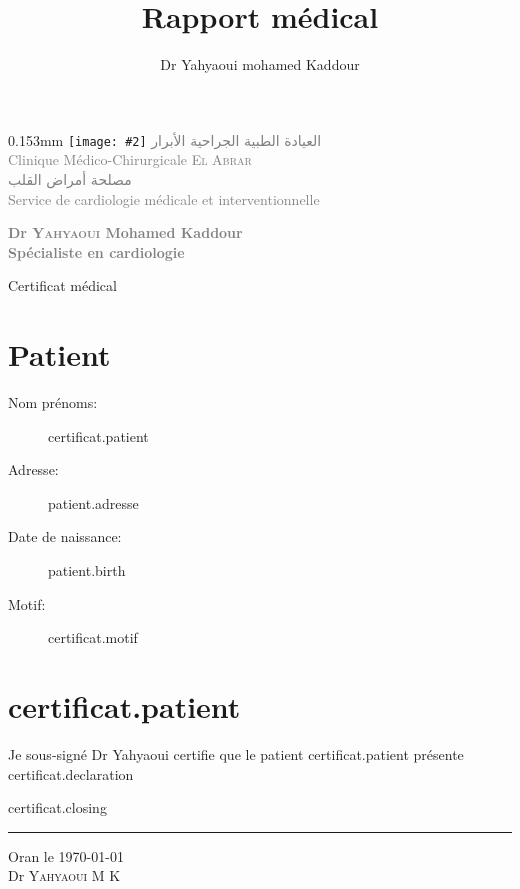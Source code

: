 \documentclass[12pt,a4paper]{article}
\author{Dr Yahyaoui mohamed Kaddour}
\title{Rapport médical }
\newcommand{\imagetext}[3][0.15]{%
    \begin{imagetextbox}[]{#1\textwidth}{3mm}%
      \texttt{[image: \#2]}%
      \tcblower%
	    #3%
    \end{imagetextbox}}
\begin{document}

  \imagetext{media/logo.png}{\textcolor{Gray}{\large{\textarabic{العيادة الطبية الجراحية الأبرار}}\\
      Clinique Médico-Chirurgicale \textsc{El Abrar}\\
      \textarabic{ مصلحة أمراض القلب}\\
      \small{Service de cardiologie médicale et interventionnelle}
    }}
  \begin{center}
    \textcolor{gray}{\textbf{ Dr \textsc{Yahyaoui} Mohamed Kaddour\\
        Spécialiste en cardiologie}\\
    }
  \end{center}

  \begin{center} \huge{Certificat médical}

  \end{center}


  \section{Patient}
  \begin{description}
	\item[Nom prénoms:] {{ certificat.patient }}
	\item[Adresse:] {{ patient.adresse }}
	\item[Date de naissance:] {{ patient.birth }}

  \item[Motif:] {{ certificat.motif }}
    \end{description}
    \section*{ {{ certificat.patient}} }

    Je sous-signé Dr Yahyaoui certifie que le patient {{ certificat.patient }}
    présente {{ certificat.declaration }}


    \raggedright{ {{certificat.closing}} }
                  
                  \begin{center}
                    \rule{8cm}{0.4pt}
                  \end{center}
                  \vspace{2cm}
                  \flushbottom\raggedleft Oran le \today\\
                  \raggedleft Dr \textsc{Yahyaoui M K}\\
                
\end{document}
